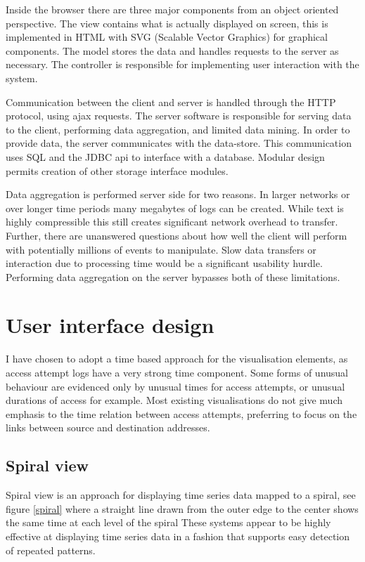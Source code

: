 Inside the browser there are three major components from an object oriented perspective. The view contains what is actually displayed on screen, this is implemented in HTML with SVG (Scalable Vector Graphics) for graphical components. The model stores the data and handles requests to the server as necessary. The controller is responsible for implementing user interaction with the system.

Communication between the client and server is handled through the HTTP protocol, using ajax requests.  The server software is responsible for serving data to the client, performing data aggregation, and limited data mining. In order to provide data, the server communicates with the data-store. This communication uses SQL and the JDBC api to interface with a database. Modular design permits creation of other storage interface modules. 

Data aggregation is performed server side for two reasons. In larger networks or over longer time periods many megabytes of logs can be created. While text is highly compressible this still creates significant network overhead to transfer. Further, there are unanswered questions about how well the client will perform with potentially millions of events to manipulate. Slow data transfers or interaction due to processing time would be a significant usability hurdle. Performing data aggregation on the server bypasses both of these limitations. 

\section{User interface design}\label{screen_design} 
  
I have chosen to adopt a time based approach for the visualisation elements, as access attempt logs have a very strong time component. Some forms of unusual behaviour are evidenced only by unusual times for access attempts, or unusual durations of access for example. Most existing visualisations do not give much emphasis to the time relation between access attempts, preferring to focus on the links between source and destination addresses. 

\subsection{Spiral view}

Spiral view is an approach for displaying time series data mapped to a spiral, see figure \ref{spiral} where a straight line drawn from the outer edge to the center shows the same time at each level of the spiral \cite{bertini2007spiralview, chin2009visual}
These systems appear to be highly effective at displaying time series data in a fashion that supports easy detection of repeated patterns. 


